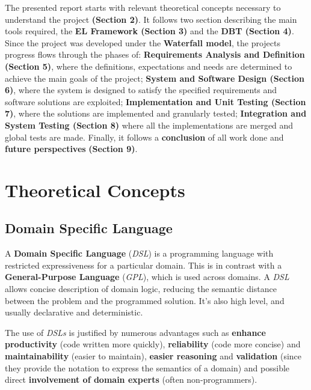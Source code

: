 \documentclass[12pt]{article}
\begin{document}
{The presented report starts with relevant theoretical concepts necessary to understand the project \textbf{(Section 2)}. It follows two section describing the main tools required, the \textbf{EL Framework (Section 3)} and the \textbf{DBT (Section 4)}. Since the project was developed under the \textbf{Waterfall model}, the projects progress flows through the phases of: \textbf{Requirements Analysis and Definition (Section 5)}, where the definitions, expectations and needs are determined to achieve the main goals of the project; \textbf{System and Software Design (Section 6)}, where the system is designed to satisfy the specified requirements and software solutions are exploited; \textbf{Implementation and Unit Testing (Section 7)}, where the solutions are implemented and granularly tested; \textbf{Integration and System Testing (Section 8)} where all the implementations are merged and global tests are made.
Finally, it follows a \textbf{conclusion} of all work done and \textbf{future perspectives} \textbf{(Section 9)}.






\newpage
\section{Theoretical Concepts}
\subsection{Domain Specific Language}

A \textbf{Domain Specific Language} (\textit{DSL}) is a programming language with restricted expressiveness for a particular domain. This is in contrast with a \textbf{General-Purpose Language} (\textit{GPL}), which is used across domains. A \textit{DSL} allows concise description of domain logic, reducing the semantic distance between the problem and the programmed solution. It's also high level, and usually declarative and deterministic. \cite{Fowler:2010:DSL:1809745}

The use of \textit{DSLs} is justified by numerous advantages such as \textbf{enhance productivity} (code written more quickly), \textbf{reliability} (code more concise) and \textbf{maintainability} (easier to maintain), \textbf{easier reasoning} and \textbf{validation} (since they provide the notation to express the semantics of a domain) and possible direct \textbf{involvement of domain experts} (often non-programmers). \cite{DSL1} \cite{DSL_site}

}
\end{document}
